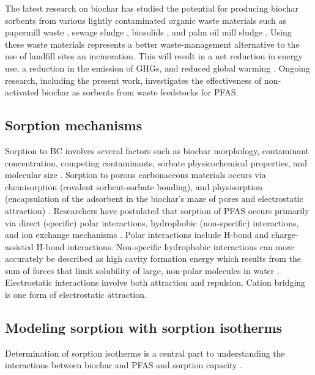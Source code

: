 The latest research on biochar has studied the potential for producing biochar sorbents from various lightly contaminated organic waste materials such as papermill waste \citep{van2010effects}, sewage sludge \citep{fathianpour2018lead}, biosolids \citep{wang2011}, and palm oil mill sludge \citep{lam2017adsorption}.  Using these waste materials represents a better waste-management alternative to the use of landfill sites an incineration. This will result in a net reduction in energy use, a reduction in the emission of GHGs,  and reduced global warming \citep{Alhashimi2017}. Ongoing research, including the present work, investigates the effectiveness of non-activated biochar as sorbents from waste feedstocks for PFAS. 

\subsection{Sorption mechanisms}\label{sec:mechanisms}
Sorption to \acrshort{BC} involves several factors such as biochar morphology, contaminant concentration, competing contaminants, sorbate physicochemical properties, and molecular size \citep{Li2019,du2014adsorption}. Sorption to porous carbonaceous materials occurs via chemisorption (covalent sorbent-sorbate bonding), and physisorption (encapsulation of the adsorbent in the biochar's maze of pores and electrostatic attraction) \citep{Li2019}. Researchers have postulated that sorption of PFAS occurs primarily via direct (specific) polar interactions, hydrophobic (non-specific) interactions, and ion exchange mechanisms \citep{Hale2017fire,yu2009sorption}. Polar interactions include H-bond and charge-assisted H-bond interactions. Non-specific hydrophobic interactions can more accurately be described as high cavity formation energy which results from the sum of forces that limit solubility of large, non-polar molecules in water \citep{Arp2006,sigmund2022sorption}. Electrostatic interactions involve both attraction and repulsion. Cation bridging is one form of electrostatic attraction.

\subsection{Modeling sorption with sorption isotherms}
Determination of sorption isotherms is a central part to understanding the interactions between biochar and PFAS and sorption capacity \citep{yu2009sorption,Li2019}.


